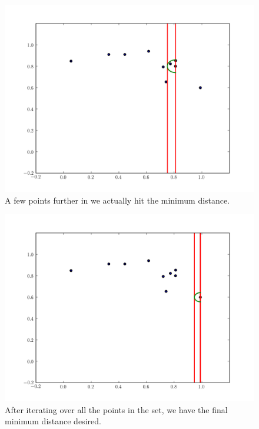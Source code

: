 \begin{figure}[H]
\includegraphics[width = .8\textwidth]{simple5.pdf}
\caption{A few points further in we actually hit the minimum distance.}
\end{figure}

\begin{figure}[H]
\includegraphics[width = .8\textwidth]{simple7.pdf}
\caption{After iterating over all the points in the set, we have the final minimum distance desired.}
\end{figure}

